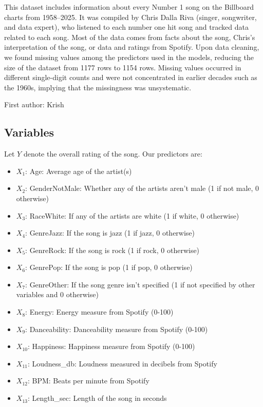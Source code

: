 \documentclass[11pt]{article}
\begin{document}
This dataset includes information about every Number 1 song on the Billboard charts from 1958--2025. It was compiled
by Chris Dalla Riva (singer, songwriter, and data expert), who listened to each number one hit song and tracked data related to each song.
Most of the data comes from facts about the song, Chris's interpretation of the song, or data and ratings from Spotify.
Upon data cleaning, we found missing values among the predictors used in the models, reducing the size of the dataset from 1177 rows to 1154 rows. 
Missing values occurred in different single-digit counts and were not concentrated in earlier decades such as the 1960s, implying that the missingness was unsystematic.

{\scriptsize First author: Krish}

\subsection{Variables}
Let $Y$ denote the overall rating of the song. Our predictors are:

\begin{itemize} 
\item $X_1$: Age: Average age of the artist(s) 
\item $X_2$: GenderNotMale: Whether any of the artists aren't male (1 if not male, 0 otherwise) 
\item $X_3$: RaceWhite: If any of the artists are white (1 if white, 0 otherwise) 
\item $X_4$: GenreJazz: If the song is jazz (1 if jazz, 0 otherwise) 
\item $X_5$: GenreRock: If the song is rock (1 if rock, 0 otherwise) 
\item $X_6$: GenrePop: If the song is pop (1 if pop, 0 otherwise) 
\item $X_7$: GenreOther: If the song genre isn't specified (1 if not specified by other variables and 0 otherwise) 
\item $X_8$: Energy: Energy measure from Spotify (0-100) 
\item $X_9$: Danceability: Danceability measure from Spotify (0-100) 
\item $X_{10}$: Happiness: Happiness measure from Spotify (0-100) 
\item $X_{11}$: Loudness\_db: Loudness measured in decibels from Spotify 
\item $X_{12}$: BPM: Beats per minute from Spotify 
\item $X_{13}$: Length\_sec: Length of the song in seconds 
\end{itemize}
\end{document}
